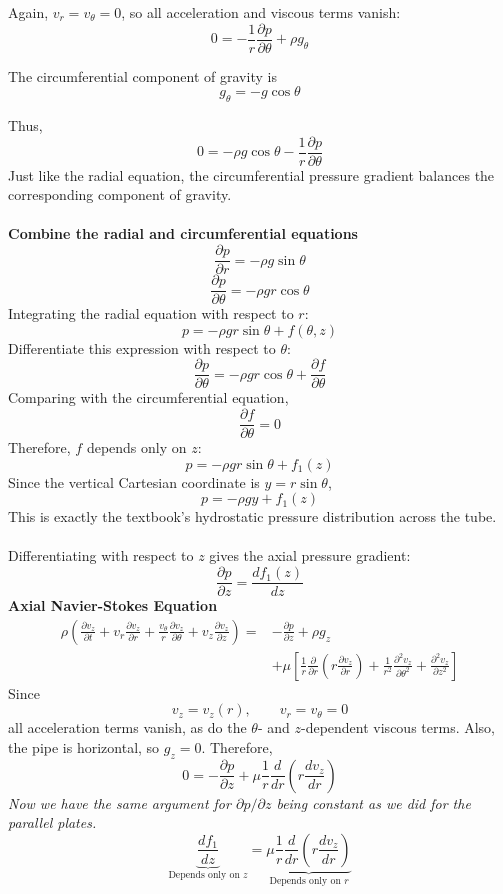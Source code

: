﻿\documentclass[12pt]{article}
\begin{document}
Again, \(v_r=v_\theta=0\), so all acceleration and viscous terms vanish:
\[
0=-\frac1r\frac{\partial p}{\partial\theta}+\rho g_\theta
\]

The circumferential component of gravity is
\[
g_\theta=-g\cos\theta
\]

Thus,
\[
\boxed{0=-\rho g\cos\theta-\frac1r\frac{\partial p}{\partial\theta}}
\]
Just like the radial equation, the circumferential pressure gradient balances the corresponding component of gravity.\\\\
\textbf{Combine the radial and circumferential equations}
\[
\frac{\partial p}{\partial r}=-\rho g\sin\theta
\]
\[
\frac{\partial p}{\partial\theta}=-\rho gr\cos\theta
\]
Integrating the radial equation with respect to \(r\):
\[
p=-\rho gr\sin\theta+f(\theta,z)
\]
Differentiate this expression with respect to \(\theta\):
\[
\frac{\partial p}{\partial\theta}=-\rho gr\cos\theta+\frac{\partial f}{\partial\theta}
\]
Comparing with the circumferential equation,
\[
\frac{\partial f}{\partial\theta}=0
\]
Therefore, \(f\) depends only on \(z\):
\[
\boxed{p=-\rho gr\sin\theta+f_1(z)}
\]
Since the vertical Cartesian coordinate is \(y=r\sin\theta\),
\[
\boxed{p=-\rho gy+f_1(z)}
\]
This is exactly the textbook's hydrostatic pressure distribution across the tube.\\\\
Differentiating with respect to \(z\) gives the axial pressure gradient:
\[
\frac{\partial p}{\partial z}=\frac{df_1(z)}{dz}
\]
\textbf{Axial Navier-Stokes Equation}
\[
\begin{aligned}
\rho\left(
\frac{\partial v_z}{\partial t}
+v_r\frac{\partial v_z}{\partial r}
+\frac{v_\theta}{r}\frac{\partial v_z}{\partial\theta}
+v_z\frac{\partial v_z}{\partial z}
\right)
={}&-\frac{\partial p}{\partial z}+\rho g_z\\
&+\mu\left[
\frac1r\frac{\partial}{\partial r}\left(r\frac{\partial v_z}{\partial r}\right)
+\frac1{r^2}\frac{\partial^2v_z}{\partial\theta^2}
+\frac{\partial^2v_z}{\partial z^2}
\right]
\end{aligned}
\]
Since
\[
v_z=v_z(r),\qquad v_r=v_\theta=0
\]
all acceleration terms vanish, as do the \(\theta\)- and \(z\)-dependent viscous terms. Also, the pipe is horizontal, so \(g_z=0\). Therefore,
\[
\boxed{0=-\frac{\partial p}{\partial z}+\mu\frac1r\frac{d}{dr}\left(r\frac{dv_z}{dr}\right)}
\]
\textit{Now we have the same argument for $\partial p/\partial z$ being constant as we did for the parallel plates.} 
\[
\underbrace{\frac{df_1}{dz}}_{\text{Depends only on }z}
=
\underbrace{\mu\frac1r\frac{d}{dr}\left(r\frac{dv_z}{dr}\right)}_{\text{Depends only on }r}
\]
\end{document}
